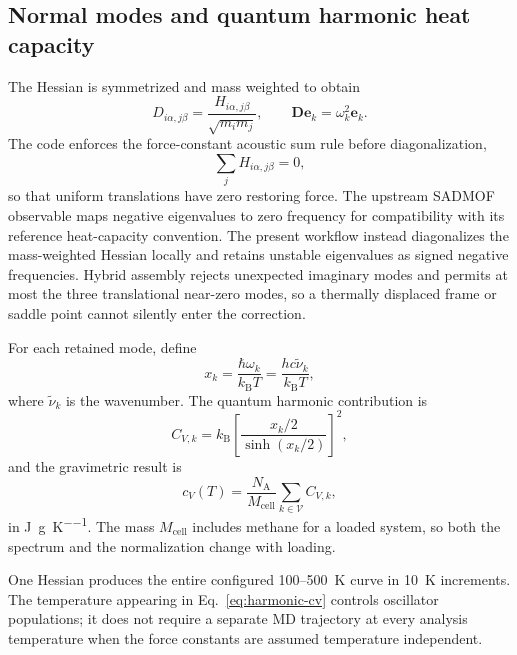 \documentclass[10pt,a4paper,twocolumn]{article}
\begin{document}
\subsection{Normal modes and quantum harmonic heat capacity}

The Hessian is symmetrized and mass weighted to obtain
\begin{equation}
  D_{i\alpha,j\beta}
  =\frac{H_{i\alpha,j\beta}}{\sqrt{m_i m_j}},
  \qquad
  \bm D\bm e_k=\omega_k^2\bm e_k.
\end{equation}
The code enforces the force-constant acoustic sum rule before diagonalization,
\begin{equation}
  \sum_j H_{i\alpha,j\beta}=0,
\end{equation}
so that uniform translations have zero restoring force. The upstream SADMOF
observable maps negative eigenvalues to zero frequency for compatibility with
its reference heat-capacity convention. The present workflow instead
diagonalizes the mass-weighted Hessian locally and retains unstable eigenvalues
as signed negative frequencies. Hybrid assembly rejects unexpected imaginary
modes and permits at most the three translational near-zero modes, so a
thermally displaced frame or saddle point cannot silently enter the correction.

For each retained mode, define
\begin{equation}
  x_k=\frac{\hbar\omega_k}{k_{\mathrm B}T}
      =\frac{hc\tilde\nu_k}{k_{\mathrm B}T},
\end{equation}
where $\tilde\nu_k$ is the wavenumber. The quantum harmonic contribution is
\begin{equation}
  C_{V,k}=k_{\mathrm B}
  \left[\frac{x_k/2}{\sinh(x_k/2)}\right]^2,
\end{equation}
and the gravimetric result is
\begin{equation}
  c_V(T)=\frac{N_{\mathrm A}}{M_{\mathrm{cell}}}
  \sum_{k\in\mathcal V} C_{V,k},
  \label{eq:harmonic-cv}
\end{equation}
in \si{J\per g\per K}. The mass $M_{\mathrm{cell}}$ includes methane for a
loaded system, so both the spectrum and the normalization change with loading.

One Hessian produces the entire configured 100--\SI{500}{K} curve in
\SI{10}{K} increments. The temperature appearing in
Eq.~\eqref{eq:harmonic-cv} controls oscillator populations; it does not require
a separate MD trajectory at every analysis temperature when the force
constants are assumed temperature independent.
\end{document}
